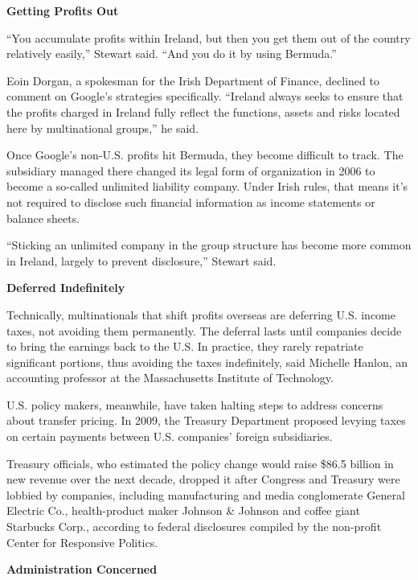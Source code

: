 \begin{select}
\begin{center} \textbf{Getting Profits Out}
\end{center}

``You accumulate profits within Ireland, but then you get them out of the country relatively easily,'' Stewart said. ``And you do it by using Bermuda.''

Eoin Dorgan, a spokesman for the Irish Department of Finance, declined to comment on Google's strategies specifically. ``Ireland always seeks to ensure that the profits charged in Ireland fully reflect the functions, assets and risks located here by multinational groups,'' he said.

Once Google's non-U.S. profits hit Bermuda, they become difficult to track. The subsidiary managed there changed its legal form of organization in 2006 to become a so-called unlimited liability company. Under Irish rules, that means it's not required to disclose such financial information as income statements or balance sheets.

``Sticking an unlimited company in the group structure has become more common in Ireland, largely to prevent disclosure,'' Stewart said.

\begin{center} \textbf{Deferred Indefinitely}
\end{center}

Technically, multinationals that shift profits overseas are deferring U.S. income taxes, not avoiding them permanently. The deferral lasts until companies decide to bring the earnings back to the U.S. In practice, they rarely repatriate significant portions, thus avoiding the taxes indefinitely, said Michelle Hanlon, an accounting professor at the Massachusetts Institute of Technology.

U.S. policy makers, meanwhile, have taken halting steps to address concerns about transfer pricing. In 2009, the Treasury Department proposed levying taxes on certain payments between U.S. companies' foreign subsidiaries.

Treasury officials, who estimated the policy change would raise \$86.5 billion in new revenue over the next decade, dropped it after Congress and Treasury were lobbied by companies, including manufacturing and media conglomerate General Electric Co., health-product maker Johnson \& Johnson and coffee giant Starbucks Corp., according to federal disclosures compiled by the non-profit Center for Responsive Politics.

\begin{center} \textbf{Administration Concerned}
\end{center}


\end{select}
